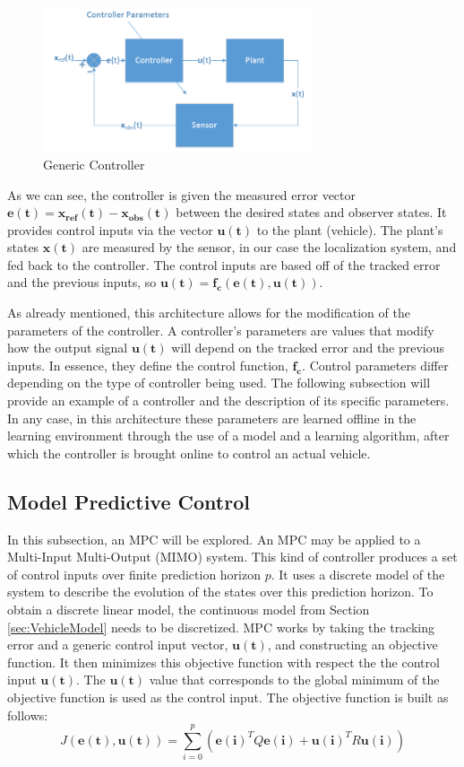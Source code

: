 \documentclass[conference]{IEEEtran}
\begin{document}
\begin{figure}[tb]
\centering
\includegraphics[width=80mm]{Controller.PNG}
\caption{Generic Controller}
\label{fig:Control}
\end{figure} 

As we can see, the controller is given the measured error vector $\mathbf{e(t)} = \mathbf{x_{ref}(t)} - \mathbf{x_{obs}(t)}$ between the desired states and observer states. It provides control inputs via the vector $\mathbf{u(t)}$ to the plant (vehicle). The plant's states $\mathbf{x(t)}$ are measured by the sensor, in our case the localization system, and fed back to the controller. The control inputs are based off of the tracked error and the previous inputs, so $\mathbf{u(t)} = \mathbf{f_{c}(e(t), u(t))}$.

As already mentioned, this architecture allows for the modification of the parameters of the controller. A controller's parameters are values that modify how the output signal $\mathbf{u(t)}$ will depend on the tracked error and the previous inputs. In essence, they define the control function, $\mathbf{f_{c}}$. Control parameters differ depending on the type of controller being used. The following subsection will provide an example of a controller and the description of its specific parameters. In any case, in this architecture these parameters are learned offline in the learning environment through the use of a model and a learning algorithm, after which the controller is brought online to control an actual vehicle.

\subsection{Model Predictive Control}

In this subsection, an MPC will be explored. An MPC may be applied to a Multi-Input Multi-Output (MIMO) system. This kind of controller produces a set of control inputs over finite prediction horizon $p$. It uses a discrete model of the system to describe the evolution of the states over this prediction horizon. To obtain a discrete linear model, the continuous model from Section \ref{sec:VehicleModel} needs to be discretized. MPC works by taking the tracking error and a generic control input vector, $\mathbf{u(t)}$, and constructing an objective function. It then minimizes this objective function with respect the the control input $\mathbf{u(t)}$. The $\mathbf{u(t)}$ value that corresponds to the global minimum of the objective function is used as the control input. The objective function is built as follows: $$J(\mathbf{e(t)}, \mathbf{u(t)}) = \sum_{i=0}^{p}(\mathbf{e(i)}^{T}Q\mathbf{e(i)}+\mathbf{u(i)}^TR\mathbf{u(i)})$$
\end{document}
